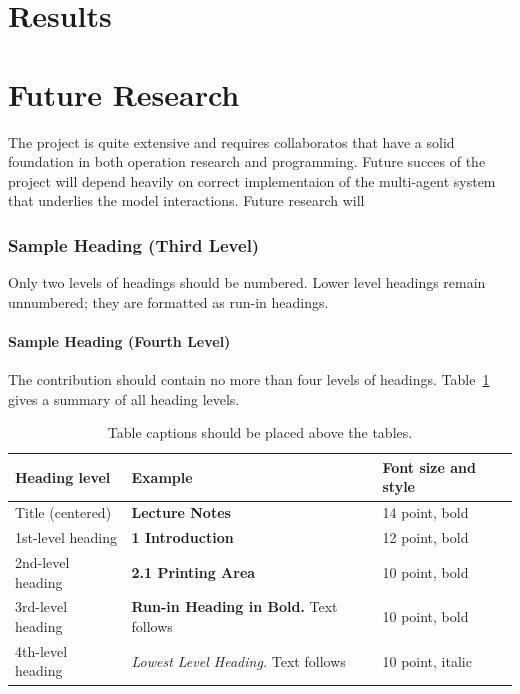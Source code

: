 \documentclass[runningheads]{llncs}
\begin{document}



\section{Results}


\section{Future Research}
The project is quite extensive and requires collaboratos that have a solid foundation in both
operation research and programming. Future succes of the project will depend heavily on correct
implementaion of the multi-agent system that underlies the model interactions. Future research 
will 


\subsubsection{Sample Heading (Third Level)} Only two levels of
headings should be numbered. Lower level headings remain unnumbered;
they are formatted as run-in headings.

\paragraph{Sample Heading (Fourth Level)}
The contribution should contain no more than four levels of
headings. Table~\ref{tab1} gives a summary of all heading levels.

\begin{table}
\caption{Table captions should be placed above the
tables.}\label{tab1}
\begin{tabular}{|l|l|l|}
\hline
Heading level &  Example & Font size and style\\
\hline
Title (centered) &  {\Large\bfseries Lecture Notes} & 14 point, bold\\
1st-level heading &  {\large\bfseries 1 Introduction} & 12 point, bold\\
2nd-level heading & {\bfseries 2.1 Printing Area} & 10 point, bold\\
3rd-level heading & {\bfseries Run-in Heading in Bold.} Text follows & 10 point, bold\\
4th-level heading & {\itshape Lowest Level Heading.} Text follows & 10 point, italic\\
\hline
\end{tabular}
\end{table}
\end{document}
